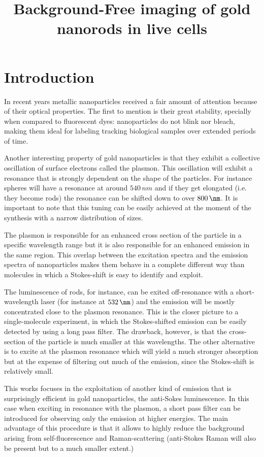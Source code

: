 \documentclass[twocolumn]{article}
\title{Background-Free imaging of gold nanorods in live cells}
\author{Aquiles Carattino \and \and Veer Keizer \and Michel Orrit}
\begin{document}
\maketitle
{}
\section{Introduction}
In recent years metallic nanoparticles received a fair amount of attention
because of their optical properties. The first to mention is their great
stability, specially when compared to fluorescent dyes: nanoparticles do not
blink nor bleach, making them ideal for labeling tracking biological samples
over extended periods of time. 

Another interesting property of gold nanoparticles is that they exhibit a
collective oscillation of surface electrons called the plasmon. This oscillation
will exhibit a resonance that is strongly dependent on the shape of the
particles. For instance spheres will have a resonance at around $540\,nm$ and if
they get elongated (i.e. they become rods) the resonance can be shifted down to
over $800\,\nm$. It is important to note that this tuning can be easily achieved
at the moment of the synthesis with a narrow distribution of sizes. 

The plasmon is responsible for an enhanced cross section of the particle in a
specific wavelength range but it is also responsible for an enhanced
emission in the same region. This overlap between the excitation spectra and the
emission spectra of nanoparticles makes them behave in a complete different way
than molecules in which a Stokes-shift is easy to identify and exploit. 

The luminescence of rods, for instance, can be exited off-resonance with a
short-wavelength laser (for instance at $532\,\nm$) and the emission will be
mostly concentrated close to the plasmon resonance. This is the closer picture
to a single-molecule experiment, in which the Stokes-shifted emission can be
easily detected by using a long pass filter. The drawback, however, is that the
cross-section of the particle is much smaller at this wavelengths. The other
alternative is to excite at the plasmon resonance which will yield a much
stronger absorption but at the expense of filtering out much of the emission,
since the Stokes-shift is relatively small. 

This works focuses in the exploitation of another kind of emission that is
surprisingly efficient in gold nanoparticles, the anti-Sokes luminescence. In
this case when exciting in resonance with the plasmon, a short pass filter can
be introduced for observing only the emission at higher energies. The main
advantage of this procedure is that it allows to highly reduce the background
arising from self-fluorescence and Raman-scattering (anti-Stokes Raman will also
be present but to a much smaller extent.) 
\end{document}
